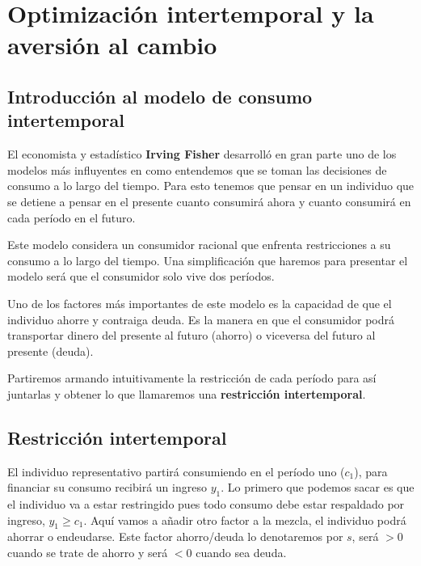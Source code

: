 \section{Optimización intertemporal y la aversión al cambio}
\subsection{Introducción al modelo de consumo intertemporal}
El economista y estadístico \textbf{Irving Fisher} desarrolló en gran parte uno de los modelos más influyentes en como entendemos que se toman las decisiones de consumo a lo largo del tiempo. Para esto tenemos que pensar en un individuo que se detiene a pensar en el presente cuanto consumirá ahora y cuanto consumirá en cada período en el futuro. 

Este modelo considera un consumidor racional que enfrenta restricciones a su consumo a lo largo del tiempo. Una simplificación que haremos para presentar el modelo será que el consumidor solo vive dos períodos. 

Uno de los factores más importantes de este modelo es la capacidad de que el individuo ahorre y contraiga deuda. Es la manera en que el consumidor podrá transportar dinero del presente al futuro (ahorro) o viceversa del futuro al presente (deuda).

Partiremos armando intuitivamente la restricción de cada período para así juntarlas y obtener lo que llamaremos una \textbf{restricción intertemporal}.

\subsection{Restricción intertemporal}
El individuo representativo partirá consumiendo en el período uno ($c_1$), para financiar su consumo recibirá un ingreso $y_1$. Lo primero que podemos sacar es que el individuo va a estar restringido pues todo consumo debe estar respaldado por ingreso, $y_1 \geq c_1$. Aquí vamos a añadir otro factor a la mezcla, el individuo podrá ahorrar o endeudarse. Este factor ahorro/deuda lo denotaremos por $s$, será $>0$ cuando se trate de ahorro y será $<0$ cuando sea deuda.

